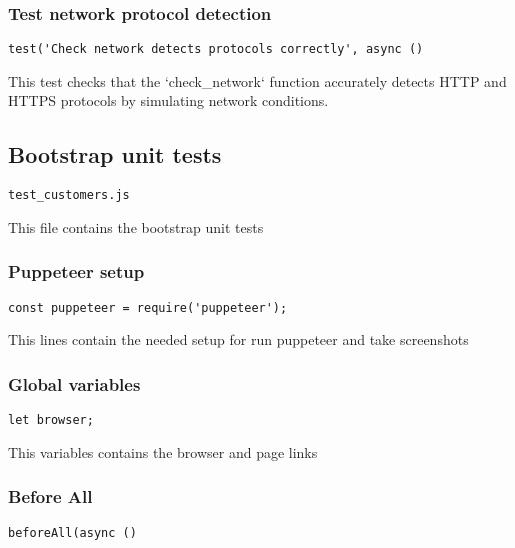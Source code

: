 \documentclass[a4paper]{article}
\begin{document}
\hypertarget{toc543}{}
\subsubsection{Test network protocol detection}

\begin{lstlisting}
test('Check network detects protocols correctly', async ()
\end{lstlisting}

This test checks that the `check\_network` function accurately detects
HTTP and HTTPS protocols by simulating network conditions.

\hypertarget{toc544}{}
\subsection{Bootstrap unit tests}

\begin{lstlisting}
test_customers.js
\end{lstlisting}

This file contains the bootstrap unit tests

\hypertarget{toc545}{}
\subsubsection{Puppeteer setup}

\begin{lstlisting}
const puppeteer = require('puppeteer');
\end{lstlisting}

This lines contain the needed setup for run puppeteer and take screenshots

\hypertarget{toc546}{}
\subsubsection{Global variables}

\begin{lstlisting}
let browser;
\end{lstlisting}

This variables contains the browser and page links

\hypertarget{toc547}{}
\subsubsection{Before All}

\begin{lstlisting}
beforeAll(async ()
\end{lstlisting}
\end{document}
